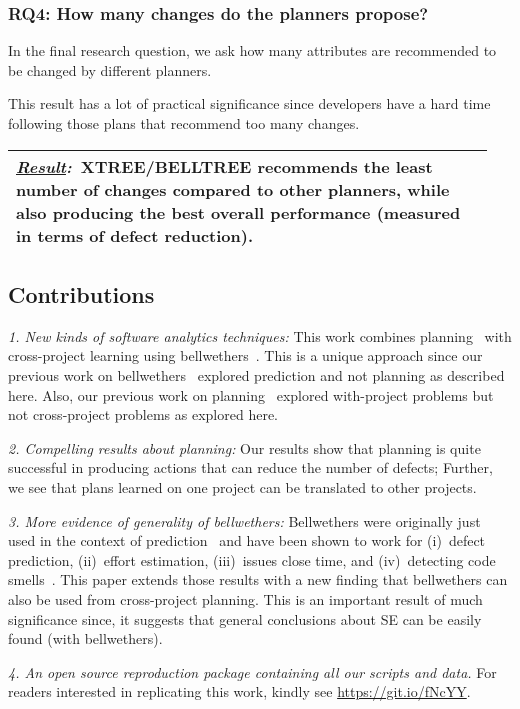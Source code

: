 \documentclass[smallextended]{svjour3}       %
\newcommand{\result}[1]{
\vspace{0.2cm}
\noindent\begin{minipage}{\linewidth}
\begin{tabular}{|p{0.95\linewidth}|}
\hline\vspace{-0.2cm}
\textbf{\textit{\underline{Result}:}}~#1\\\hline
\end{tabular}
\end{minipage}\bigstrut
}
\begin{document}
\subsubsection*{RQ4: How many changes do the planners propose?}

In the final research question, we ask how many attributes are recommended to be changed by different planners.

This result has a lot of practical significance since developers have a hard time following those plans that recommend too many changes.


\result{XTREE/BELLTREE recommends the least number of changes compared to other planners,  while also producing the best overall performance (measured in
terms of defect reduction).}

\subsection{Contributions}
\label{sect:contrib}
\textit{1. New kinds of software analytics techniques:} This work combines planning~\cite{krishna17a} with cross-project learning using bellwethers~\cite{krishna16}. This is a unique approach since our previous work on bellwethers~\cite{krishna16, krishna17b} explored prediction and not planning as described here. Also, our previous work on planning~\cite{krishna17a} explored with-project problems but not cross-project problems as explored here. 

\textit{2. Compelling results about planning:} Our results show that planning is quite successful in producing actions that can reduce the number of defects; Further, we see that plans learned on one project can be translated to other projects.

\textit{3. More evidence of generality of bellwethers:}  Bellwethers were
originally just used in the context of prediction~\cite{krishna16} and have been shown to work for (i)~defect prediction, (ii)~effort estimation, (iii)~issues close time, and (iv)~detecting code smells~\cite{krishna17b}. This paper extends those results with a new finding that bellwethers can also be used from cross-project planning. This is an important result of much significance since, it suggests that general conclusions about SE can be easily found (with bellwethers).

\textit{4. An open source reproduction package containing all our scripts and data.} For readers interested in replicating this work, kindly see \url{https://git.io/fNcYY}.
 
\end{document}
